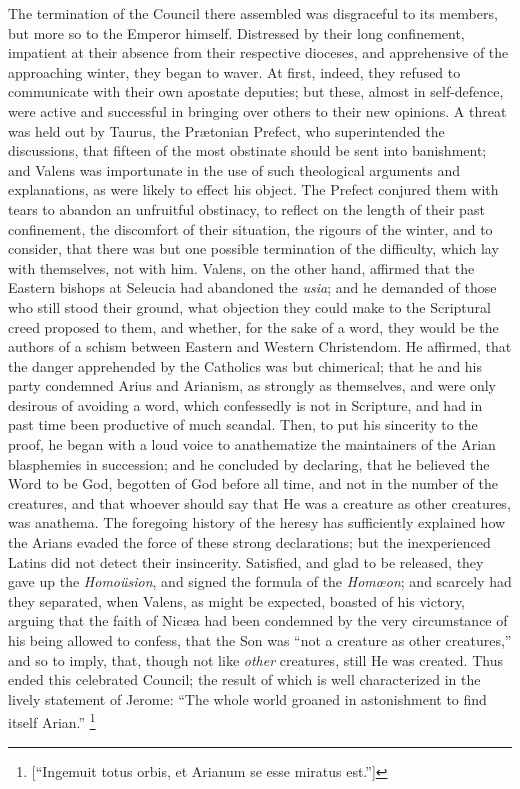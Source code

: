 The termination of the Council there assembled was disgraceful to
its members, but more so to the Emperor himself. Distressed by their
long confinement, impatient at their absence from their respective
dioceses, and apprehensive of the approaching winter, they began to
waver. At first, indeed, they refused to communicate with their own
apostate deputies; but these, almost in self-defence, were active and
successful in bringing over others to their new opinions. A threat was
held out by Taurus, the Prætonian Prefect, who superintended the
discussions, that fifteen of the most obstinate should be sent into
banishment; and Valens was importunate in the use of such theological
arguments and explanations, as were likely to effect his object. The
Prefect conjured them with tears to abandon an unfruitful obstinacy,
to reflect on the length of their past confinement, the discomfort of
their situation, the rigours of the winter, and to consider, that
there was but one possible termination of the difficulty, which lay
with themselves, not with him. Valens, on the other hand, affirmed
that the Eastern bishops at Seleucia had abandoned the \emph{usia};
and he demanded of those who still stood their ground, what objection
they could make to the Scriptural creed proposed to them, and
whether, for the sake of a word, they would be the authors of a schism
between Eastern and Western Christendom. He affirmed, that the danger
apprehended by the Catholics was but chimerical; that he and his party
condemned Arius and Arianism, as strongly as themselves, and were only
desirous of avoiding a word, which confessedly is not in Scripture,
and had in past time been productive of much scandal. Then, to put his
sincerity to the proof, he began with a loud voice to anathematize the
maintainers of the Arian blasphemies in succession; and he concluded
by declaring, that he believed the Word to be God, begotten of God
before all time, and not in the number of the creatures, and that
whoever should say that He was a creature as other creatures, was
anathema. The foregoing history of the heresy has sufficiently
explained how the Arians evaded the force of these strong
declarations; but the inexperienced Latins did not detect their
insincerity. Satisfied, and glad to be released, they gave up the \emph{Homoüsion},
and signed the formula of the \emph{Homœon}; and scarcely had they
separated, when Valens, as might be expected, boasted of his victory,
arguing that the faith of Nicæa had been condemned by the very
circumstance of his being allowed to confess, that the Son was
``not a creature as other creatures,'' and so to imply, that,
though not like \emph{other} creatures, still He was created. Thus
ended this celebrated Council; the result of which is well
characterized in the lively statement of Jerome: ``The whole world
groaned in astonishment to find itself Arian.'' \footnote{[``Ingemuit totus orbis, et Arianum se
esse miratus est.'']}

